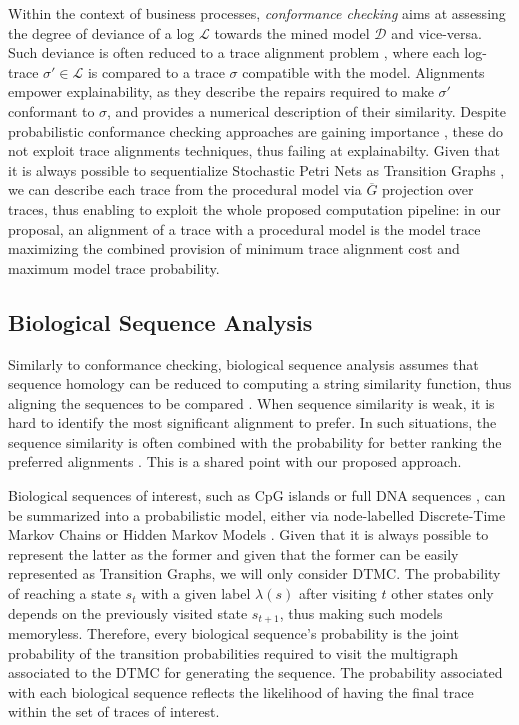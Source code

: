 Within the context of business processes, \textit{conformance checking} aims at assessing the degree of deviance of a log $\mathcal{L}$ towards the mined model $\mathcal{D}$ and vice-versa. Such deviance is often reduced to a  trace alignment problem \cite{DBLP:conf/edoc/AdriansyahDA11}, where each log-trace $\sigma'\in\mathcal{L}$ is compared to a trace $\sigma$ compatible with the model. Alignments empower explainability, as they describe the repairs required to make $\sigma'$ conformant to $\sigma$, and provides a numerical description of  their similarity.  Despite probabilistic conformance checking approaches are gaining importance \cite{DBLP:conf/bpm/LeemansSA19,DBLP:conf/icpm/PolyvyanyyK19,DBLP:journals/tosem/PolyvyanyySWCM20}, these do not exploit trace alignments techniques, thus failing at explainabilty. Given that it is always possible to sequentialize Stochastic Petri Nets as Transition Graphs \cite{MarsanCB84}, we can describe each trace from the procedural model via $\overline{G}$ projection over traces, thus enabling to exploit the whole proposed computation pipeline: in our proposal, an alignment of a trace with a procedural model is the model trace maximizing the combined provision of minimum trace alignment cost and maximum model trace probability.



\subsection{Biological Sequence Analysis}
Similarly to conformance checking, biological sequence analysis assumes that sequence homology can be reduced to computing a string similarity function, thus aligning the sequences to be compared \cite{durbin1998biological}. When sequence similarity is weak, it is hard to identify the most significant alignment to prefer. In such situations, the sequence similarity is often combined with the probability for better ranking the preferred alignments \cite{durbin1998biological}. This is a shared point with our proposed approach. 

Biological sequences of interest, such as CpG islands \cite{kxq005} or full DNA sequences \cite{BISHOP1986159}, can be summarized into a probabilistic model, either via node-labelled Discrete-Time Markov Chains \cite{RyabkoU08} or Hidden Markov Models \cite{Helske2018}. Given that it is always possible to represent the latter as the former \cite{DUPONT20051349} and given that the former can be easily represented as Transition Graphs, we will only consider DTMC. The probability of reaching a state $s_t$ with a given label $\lambda(s)$ after visiting $t$ other states only depends on the previously visited state $s_{t+1}$, thus making such models memoryless. Therefore, every biological sequence's probability is the joint probability of the transition probabilities required to visit the multigraph associated to the DTMC for generating the sequence. The probability associated with each biological sequence reflects the likelihood of having the final trace within the set of traces of interest. 

